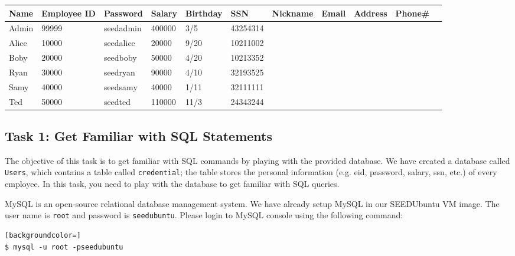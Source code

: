 \vspace{0.1in}
\begin{table}[h]
\begin{adjustbox}{max width=\textwidth}
\begin{tabular}{|l|l|l|l|l|l|l|l|l|l|l|}
\hline
Name 	& Employee ID   & Password	&Salary		&Birthday
&SSN		&Nickname	&Email		&Address	&Phone\# \\
\hline
Admin 	& 99999         & seedadmin	&400000		&3/5		&43254314	&		&		&		&\\
Alice 	& 10000 	& seedalice	&20000		&9/20		&10211002	&		&		&		&\\
Boby 	& 20000         & seedboby 	&50000		&4/20		&10213352	&		&		&		&\\
Ryan    & 30000         & seedryan	&90000		&4/10		&32193525	&		&		&		&\\
Samy 	& 40000		& seedsamy	&40000		&1/11		&32111111 	&		&		&		&\\
Ted     & 50000		& seedted	&110000		&11/3		&24343244	&		&		&		&\\
\hline
\end{tabular}
\end{adjustbox}
\end{table}





\subsection{Task 1: Get Familiar with SQL Statements}
\label{ssec:MySQLConsole}


The objective of this task is to get familiar with SQL commands by playing
with the provided database. We have created a database called {\tt Users},
which contains a table called {\tt credential}; the table stores
the personal information (e.g. eid, password, salary, ssn, etc.) of every
employee. In this task, you need to play with the database to get familiar
with SQL queries.


MySQL is an open-source relational database management system. 
We have already setup MySQL in our SEEDUbuntu VM image. 
The user name is {\tt root} and password is {\tt seedubuntu}.  
Please login to MySQL console using the following command:
	
\begin{lstlisting}[backgroundcolor=]
$ mysql -u root -pseedubuntu 
\end{lstlisting}


